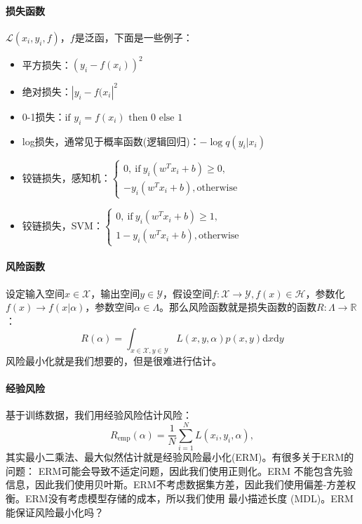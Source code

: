 \paragraph{损失函数} $\mathcal{L}(x_i,y_i,f)$，$f$是泛函，下面是一些例子：
\begin{itemize}
    \item 平方损失：$(y_i - f(x_i))^2$
    \item 绝对损失：$|y_i - f(x_i|^2$
    \item 0-1损失：$\text{if $y_i = f(x_i)$ then 0 else 1}$
    \item log损失，通常见于概率函数(逻辑回归)：$-\log q(y_i|x_i)$
    \item 铰链损失，感知机：$\left\{\begin{aligned}
        0, \ \text{if}\ y_i(w^Tx_i +b) \ge 0, \\
        -y_i(w^Tx_i +b), \text{otherwise}
    \end{aligned}\right.$
    \item 铰链损失，SVM：$\left\{\begin{aligned}
        0, \ \text{if}\ y_i(w^Tx_i +b) \ge 1, \\
        1-y_i(w^Tx_i +b), \text{otherwise}
    \end{aligned}\right.$
\end{itemize}

\paragraph{风险函数}
设定输入空间$x\in \mathcal{X}$，输出空间$y\in \mathcal{Y}$，假设空间$f: \mathcal{X} \to \mathcal{Y}, f(x) \in \mathcal{H}$，参数化$f(x) \to f(x|\alpha)$，参数空间$\alpha \in \Lambda$。那么风险函数就是损失函数的函数$R: \Lambda \to \mathbb{R}$：
$$R(\alpha) = \int_{x\in \mathcal{X}, y\in \mathcal{Y}} L(x, y, \alpha)p(x,y) \mathrm{d}x\mathrm{d}y$$
风险最小化就是我们想要的，但是很难进行估计。

\paragraph{经验风险} 基于训练数据，我们用经验风险估计风险：
$$R_\text{emp}(\alpha) = \frac{1}{N} \sum^N_{i=1}L(x_i, y_i, \alpha),$$
其实最小二乘法、最大似然估计就是经验风险最小化(ERM)。有很多关于ERM的问题：
ERM可能会导致不适定问题，因此我们使用正则化。ERM 不能包含先验信息，因此我们使用贝叶斯。ERM不考虑数据集方差，因此我们使用偏差-方差权衡。ERM没有考虑模型存储的成本，所以我们使用
最小描述长度 (MDL)。ERM能保证风险最小化吗？ 

